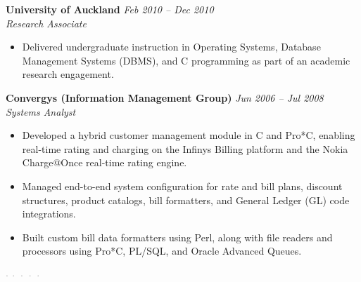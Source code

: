 \documentclass{article}
\newcommand{\job}[3]{%
    \vspace{6pt}%
    {\textbf{#1} \hfill \textit{#3}}\\[1pt]%
    {\textit{#2}}\par%
    \vspace{2pt}%
}
\begin{document}
\job{University of Auckland}{Research Associate}{Feb 2010 -- Dec 2010}
\begin{itemize}
    \item Delivered undergraduate instruction in Operating Systems, Database Management Systems (DBMS), and C programming as part of an academic research engagement.
\end{itemize}

\job{Convergys (Information Management Group)}{Systems Analyst}{Jun 2006 -- Jul 2008}
\begin{itemize}
    \item Developed a hybrid customer management module in C and Pro*C, enabling real-time rating and charging on the Infinys Billing platform and the Nokia Charge@Once real-time rating engine.

    \item Managed end-to-end system configuration for rate and bill plans, discount structures, product catalogs, bill formatters, and General Ledger (GL) code integrations.

    \item Built custom bill data formatters using Perl, along with file readers and processors using Pro*C, PL/SQL, and Oracle Advanced Queues.
\end{itemize}

\vspace{10pt}
\begin{center}
    \textcolor{darkgray}{$\cdot\ \cdot\ \cdot\ \cdot\ \cdot$}
\end{center}
\end{document}
